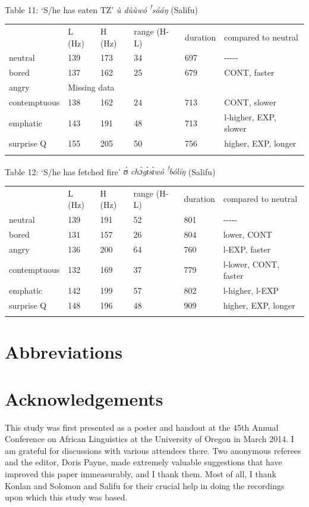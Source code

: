 \documentclass[output=paper]{langsci/langscibook}
\begin{document}
Table 11: ‘S/he has eaten TZ'  \emph{ù dùùwó \textsuperscript{!}sááŋ}  (Salifu)

\begin{tabular}{llllll} & L (Hz) & H (Hz) & range (H-L) & duration & compared to neutral\\
\lsptoprule
neutral & 139 & 173 & 34 & 697 & {}-{}-{}-{}-{}-\\
bored & 137 & 162 & 25 & 679 & CONT, faster\\
angry & \multicolumn{5}{l}{ Missing data}\\
contemptuous & 138 & 162 & 24 & 713 & CONT, slower\\
emphatic & 143 & 191 & 48 & 713 & l-higher, EXP, slower\\
surprise Q & 155 & 205 & 50 & 756 & higher, EXP, longer\\
\lspbottomrule
\end{tabular}


Table 12:	‘S/he has fetched fire'  \emph{ʊ̀ chɔ̀gɪ̀sɪ̀wó \textsuperscript{!}bólíŋ}  (Salifu)

\begin{tabular}{llllll} & L (Hz) & H (Hz) & range (H-L) & duration & compared to neutral\\
\lsptoprule
neutral & 139 & 191 & 52 & 801 & {}-{}-{}-{}-{}-\\
bored & 131 & 157 & 26 & 804 & lower, CONT\\
angry & 136 & 200 & 64 & 760 & l-EXP, faster\\
contemptuous & 132 & 169 & 37 & 779 & l-lower, CONT, faster\\
emphatic & 142 & 199 & 57 & 802 & l-higher, l-EXP\\
surprise Q & 148 & 196 & 48 & 909 & higher, EXP, longer\\
\lspbottomrule
\end{tabular}






\section*{Abbreviations}
\section*{Acknowledgements}
This study was first presented as a poster and handout at the 45th Annual Conference on African Linguistics at the University of Oregon in March 2014. I am grateful for discussions with various attendees there. Two anonymous referees and the editor, Doris Payne, made extremely valuable suggestions that have improved this paper immeasurably, and I thank them. Most of all, I thank Konlan and Solomon and Salifu for their crucial help in doing the recordings upon which this study was based.




{\sloppy
\printbibliography[heading=subbibliography,notkeyword=this]
}
\end{document}
